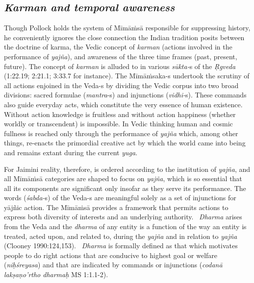 \subsection*{\textit{Karman and temporal awareness}}

\vskip 2pt

Though Pollock holds the system of Mīmāṁsā responsible for suppressing history, he conveniently ignores the close connection the Indian tradition posits between the doctrine of karma, the Vedic concept of \textit{karman} (actions involved in the performance of \textit{yajña}), and awareness of the three time frames (past, present, future). The concept of \textit{karman} is alluded to in various \textit{sūkta-}s of the \textit{Ṛgveda} (1:22.19; 2:21.1; 3:33.7 for instance). The Mīmāṁsaka-s undertook the scrutiny of all actions enjoined in the Veda-s by dividing the Vedic corpus into two broad divisions: sacred formulae (\textit{mantra}-s) and injunctions (\textit{vidhi-}s). These commands also guide everyday acts, which constitute the very essence of human existence. Without action knowledge is fruitless and without action happiness (whether worldly or transcendent) is impossible. In Vedic thinking human and cosmic fullness is reached only through the performance of \textit{yajña} which, among other things, re-enacts the primordial creative act by which the world came into being and remains extant during the current \textit{yuga}.

\vskip 2pt

For Jaimini reality, therefore, is ordered according to the institution of \textit{yajña}, and all Mīmāṁsā categories are shaped to focus on \textit{yajña}, which is so essential that all its components are significant only insofar as they serve its performance. The words (\textit{śabda-}s) of the Veda-s are meaningful solely as a set of injunctions for yājñic action. The Mīmāṁsā provides a framework that permits actions to express both diversity of interests and an underlying authority.  \textit{Dharma} arises from the Veda and the \textit{dharma} of any entity is a function of the way an entity is treated, acted upon, and related to, during the \textit{yajña} and in relation to \textit{yajña} (Clooney 1990:124,153).  \textit{Dharma} is formally defined as that which motivates people to do right actions that are conducive to highest goal or welfare (\textit{niḥśreyasa}) and that are indicated by commands or injunctions (\textit{codanā lakṣaṇo'rtho dharmaḥ} MS 1:1.1-2).

